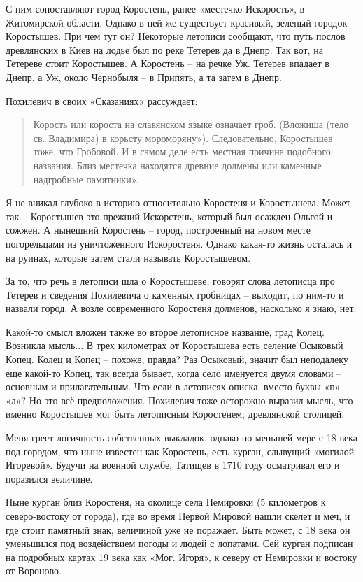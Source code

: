 С ним сопоставляют город Коростень, ранее «местечко Искорость», в Житомирской области. Однако в ней же существует красивый, зеленый городок Коростышев. При чем тут он? Некоторые летописи сообщают, что путь послов древлянских в Киев на лодье был по реке Тетерев да в Днепр. Так вот, на Тетереве стоит Коростышев. А Коростень – на речке Уж. Тетерев впадает в Днепр, а Уж, около Чернобыля – в Припять, а та затем в Днепр.

Похилевич в своих «Сказаниях» рассуждает:

\begin{quote}
Корость или короста на славянском языке означает гроб. (Вложиша (тело св. Владимира) в корьсту мороморяну»). Следовательно, Коростышев тоже, что Гробовой. И в самом деле есть местная причина подобного названия. Близ местечка находятся древние долмены или каменные надгробные памятники».
\end{quote}

Я не вникал глубоко в историю относительно Коростеня и Коростышева. Может так – Коростышев это прежний Искорстень, который был осажден Ольгой и сожжен. А нынешний Коростень – город, построенный на новом месте погорельцами из уничтоженного Искоростеня. Однако какая-то жизнь осталась и на руинах, которые затем стали называть Коростышевом. 

За то, что речь в летописи шла о Коростышеве, говорят слова летописца про Тетерев и сведения Похилевича о каменных гробницах – выходит, по ним-то и назвали город. А возле современного Коростеня долменов, насколько я знаю, нет. 

Какой-то смысл вложен также во второе летописное название, град Колец. Возникла мысль... В трех километрах от Коростышева есть селение Осыковый Копец. Колец и Копец – похоже, правда? Раз Осыковый, значит был неподалеку еще какой-то Копец, так всегда бывает, когда село именуется двумя словами – основным и прилагательным. Что если в летописях описка, вместо буквы «п» – «л»? Но это всё предположения. Похилевич тоже осторожно выразил мысль, что именно Коростышев мог быть летописным Коростенем, древлянской столицей. 

Меня греет логичность собственных выкладок, однако по меньшей мере с 18 века под городом, что ныне известен как Коростень, есть курган, слывущий «могилой Игоревой». Будучи на военной службе, Татищев в 1710 году осматривал его и поразился величине. 

Ныне курган близ Коростеня, на околице села Немировки (5 километров к северо-востоку от города), где во время Первой Мировой нашли скелет и меч, и где стоит памятный знак, величиной уже не поражает. Быть может, с 18 века он уменьшился под воздействием погоды и людей с лопатами. Сей курган подписан на подробных картах 19 века как «Мог. Игоря», к северу от Немировки и востоку от Вороново.

